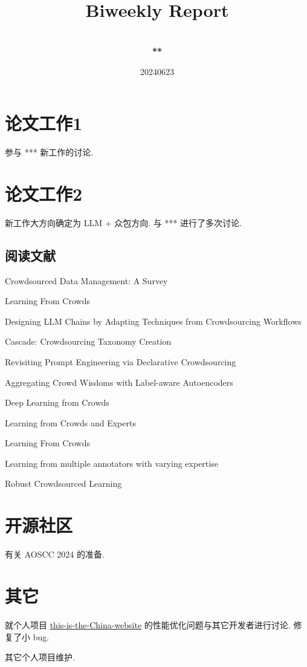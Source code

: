 \documentclass[a4paper]{article}
\title{
    \vspace*{1.0in}
     \\
    \vspace*{1in}
    \textbf{\Huge Biweekly Report}
    \vspace{0.5in}
}
\author{ \\
    \textbf{\huge ***} \\
    \vspace*{1in}
}
\date{\LARGE 20240623}
\begin{document}
\LARGE

\maketitle
\tableofcontents
\thispagestyle{empty}
\newpage

\section{论文工作1}

参与 *** 新工作的讨论.

\section{论文工作2}

新工作大方向确定为 LLM + 众包方向. 与 *** 进行了多次讨论.

\subsection{阅读文献}

Crowdsourced Data Management: A Survey

Learning From Crowds

Designing LLM Chains by Adapting Techniques from Crowdsourcing Workflows

Cascade: Crowdsourcing Taxonomy Creation

Revisiting Prompt Engineering via Declarative Crowdsourcing

Aggregating Crowd Wisdoms with Label-aware Autoencoders

Deep Learning from Crowds

Learning from Crowds and Experts

Learning From Crowds

Learning from multiple annotators with varying expertise

Robust Crowdsourced Learning

\section{开源社区}

有关 AOSCC 2024 的准备.

\section{其它}

就个人项目 \href{https://github.com/userElaina/this-is-the-China-website}{this-is-the-China-website} 的性能优化问题与其它开发者进行讨论. 修复了小 bug.

其它个人项目维护.
\end{document}
